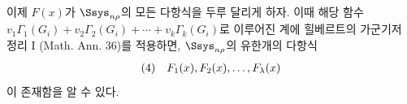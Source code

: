 
이제 $F(x)$가 $\Ssys_{n\rho}$의 모든 다항식을 두루 달리게 하자. 이때 해당 함수 $v_1\Gamma_1(G_i)+v_2\Gamma_2(G_i)+\cdots+v_k\Gamma_k(G_i)$로 이루어진 계에 힐베르트의 가군기저 정리 I (Math. Ann. 36)를 적용하면, $\Ssys_{n\rho}$의 유한개의 다항식
\[
\begin{array}{@{}l@{\quad}c@{}}
(4)& F_1(x),F_2(x),\ldots,F_\lambda(x)
\end{array}
\]
이 존재함을 알 수 있다.
